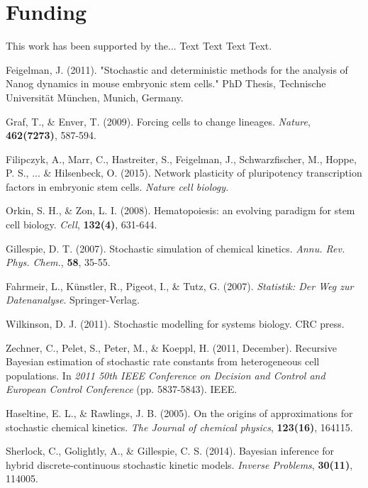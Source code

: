 \documentclass{bioinfo}
\begin{document}
\section*{Funding}

This work has been supported by the... Text Text  Text Text.\vspace*{-12pt}

%
%
%
%
%
%
%
%
%


\begin{thebibliography}{}

Feigelman, J. (2011). "Stochastic and deterministic methods for the analysis of Nanog dynamics in mouse embryonic stem cells." PhD Thesis, Technische Universit\"at M\"unchen, Munich, Germany.\vspace*{-2pt}

Graf, T., \& Enver, T. (2009). Forcing cells to change lineages. \textit{Nature}, \textbf{462(7273)}, 587-594.

Filipczyk, A., Marr, C., Hastreiter, S., Feigelman, J., Schwarzfischer, M., Hoppe, P. S., ... \& Hilsenbeck, O. (2015). Network plasticity of pluripotency transcription factors in embryonic stem cells. \textit{Nature cell biology.}

Orkin, S. H., \& Zon, L. I. (2008). Hematopoiesis: an evolving paradigm for stem cell biology. \textit{Cell}, \textbf{132(4)}, 631-644.

Gillespie, D. T. (2007). Stochastic simulation of chemical kinetics. \textit{Annu. Rev. Phys. Chem.}, \textbf{58}, 35-55.

Fahrmeir, L., K\"unstler, R., Pigeot, I., \& Tutz, G. (2007). \textit{Statistik: Der Weg zur Datenanalyse}. Springer-Verlag.

Wilkinson, D. J. (2011). Stochastic modelling for systems biology. CRC press.

Zechner, C., Pelet, S., Peter, M., \& Koeppl, H. (2011, December). Recursive Bayesian estimation of stochastic rate constants from heterogeneous cell populations. In \textit{2011 50th IEEE Conference on Decision and Control and European Control Conference} (pp. 5837-5843). IEEE.

Haseltine, E. L., \& Rawlings, J. B. (2005). On the origins of approximations for stochastic chemical kinetics. \textit{The Journal of chemical physics}, \textbf{123(16)}, 164115.

Sherlock, C., Golightly, A., \& Gillespie, C. S. (2014). Bayesian inference for hybrid discrete-continuous stochastic kinetic models. \textit{Inverse Problems}, \textbf{30(11)}, 114005.

\end{thebibliography}
\end{document}
